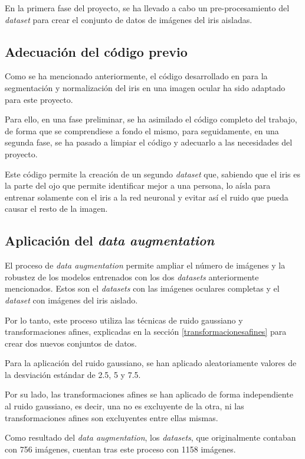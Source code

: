 En la primera fase del proyecto, se ha llevado a cabo un pre-procesamiento del \textit{dataset} para crear el conjunto de datos de imágenes del iris aisladas.

\subsection{Adecuación del código previo}

Como se ha mencionado anteriormente, el código desarrollado en \cite{tfg_iris_2020} para la segmentación y normalización del iris en una imagen ocular ha sido adaptado para este proyecto. 

Para ello, en una fase preliminar, se ha asimilado el código completo del trabajo, de forma que se comprendiese a fondo el mismo, para seguidamente, en una segunda fase, se ha pasado a limpiar el código y adecuarlo a las necesidades del proyecto. 

Este código permite la creación de un segundo \textit{dataset} que, sabiendo que el iris es la parte del ojo que permite identificar mejor a una persona, lo aísla para entrenar solamente con el iris a la red neuronal y evitar así el ruido que pueda causar el resto de la imagen. 

\subsection{Aplicación del \textit{data augmentation}}

El proceso de \textit{data augmentation} permite ampliar el número de imágenes y la robustez de los modelos entrenados con los dos \textit{datasets} anteriormente mencionados. Estos son el \textit{datasets} con las imágenes oculares completas y el \textit{dataset} con imágenes del iris aislado. 

Por lo tanto, este proceso utiliza las técnicas de ruido gaussiano y transformaciones afines, explicadas en la sección \ref{transformacionesafines} para crear dos nuevos conjuntos de datos. 

Para la aplicación del ruido gaussiano, se han aplicado aleatoriamente valores de la desviación estándar de 2.5, 5 y 7.5.

Por su lado, las transformaciones afines se han aplicado de forma independiente al ruido gaussiano, es decir, una no es excluyente de la otra, ni las transformaciones afines son excluyentes entre ellas mismas. 

Como resultado del \textit{data augmentation}, los \textit{datasets}, que originalmente contaban con 756 imágenes, cuentan tras este proceso con 1158 imágenes.

